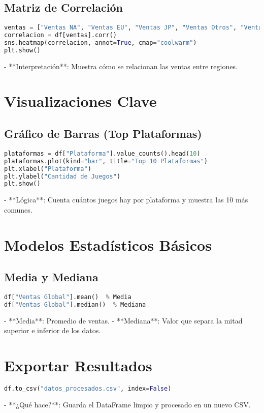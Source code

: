 \documentclass[12pt]{article}
\begin{document}
\subsection{Matriz de Correlación}
\begin{lstlisting}[language=Python]
ventas = ["Ventas NA", "Ventas EU", "Ventas JP", "Ventas Otros", "Ventas Global"]
correlacion = df[ventas].corr()
sns.heatmap(correlacion, annot=True, cmap="coolwarm")
plt.show()
\end{lstlisting}
- **Interpretación**: Muestra cómo se relacionan las ventas entre regiones.

\section{Visualizaciones Clave}
\subsection{Gráfico de Barras (Top Plataformas)}
\begin{lstlisting}[language=Python]
plataformas = df["Plataforma"].value_counts().head(10)
plataformas.plot(kind="bar", title="Top 10 Plataformas")
plt.xlabel("Plataforma")
plt.ylabel("Cantidad de Juegos")
plt.show()
\end{lstlisting}
- **Lógica**: Cuenta cuántos juegos hay por plataforma y muestra las 10 más comunes.

\section{Modelos Estadísticos Básicos}
\subsection{Media y Mediana}
\begin{lstlisting}[language=Python]
df["Ventas Global"].mean()  % Media
df["Ventas Global"].median()  % Mediana
\end{lstlisting}
- **Media**: Promedio de ventas.
- **Mediana**: Valor que separa la mitad superior e inferior de los datos.

\section{Exportar Resultados}
\begin{lstlisting}[language=Python]
df.to_csv("datos_procesados.csv", index=False)
\end{lstlisting}
- **¿Qué hace?**: Guarda el DataFrame limpio y procesado en un nuevo CSV.
\end{document}
